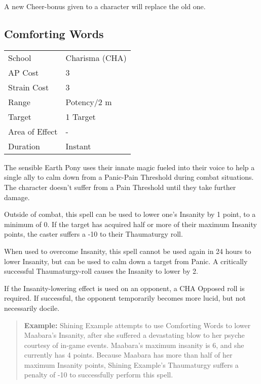 \documentclass[11pt,a4paper,twocolumn]{book}
\begin{document}
\medskip
A new Cheer-bonus given to a character will replace the old one.

\vfill


\subsection*{Comforting Words}
{
	\begin{tabu} to 75mm{| X[l,4] | X[l,7] |}
		\hline
		School 			& Charisma (CHA) 	\\
		AP Cost	      	& 3 				\\
		Strain Cost     & 3 				\\
		Range     		& Potency/2 m 		\\
		Target      	& 1 Target 			\\
		Area of Effect  & - 	 			\\
		Duration     	& Instant		 	\\ \hline
	\end{tabu}
	
}

\medskip

The sensible Earth Pony uses their innate magic fueled into their voice to help a single ally to calm down from a Panic-Pain Threshold during combat situations. The character doesn't suffer from a Pain Threshold until they take further damage.

Outside of combat, this spell can be used to lower one's Insanity by 1 point, to a minimum of 0. If the target has acquired half or more of their maximum Insanity points, the caster suffers a -10 to their Thaumaturgy roll.

When used to overcome Insanity, this spell cannot be used again in 24 hours to lower Insanity, but can be used to calm down a target from Panic. A critically successful Thaumaturgy-roll causes the Insanity to lower by 2.

If the Insanity-lowering effect is used on an opponent, a CHA Opposed roll is required. If successful, the opponent temporarily becomes more lucid, but not necessarily docile.

\begin{verse}
	\textbf{Example:} Shining Example attempts to use Comforting Words to lower Maabara's Insanity, after she suffered a devastating blow to her psyche courtesy of in-game events. Maabara's maximum insanity is 6, and she currently has 4 points. Because Maabara has more than half of her maximum Insanity points, Shining Example's Thaumaturgy suffers a penalty of -10 to successfully perform this spell.
\end{verse}
\end{document}
